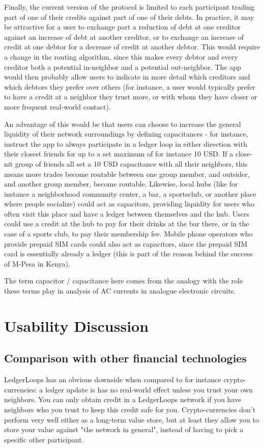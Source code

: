 \documentclass[11pt,twoside,a4paper]{article}
\begin{document}
Finally, the current version of the protocol is limited to each participant trading part of one of their credits against part of one of their debts. In practice, it may be attractive for a user to exchange part a reduction of debt at one creditor against an increase of debt at another creditor, or to exchange an increase of credit at one debtor for a decrease of credit at another debtor. This would require a change in the routing algorithm, since this makes every debtor and every creditor both a potential in-neighbor and a potential out-neighbor. The app would then probably allow users to indicate in more detail which creditors and which debtors they prefer over others (for instance, a user would typically prefer to have a credit at a neighbor they trust more, or with whom they have closer or more frequent real-world contact).

An advantage of this would be that users can choose to increase the general liquidity of their network surroundings by defining capacitances - for instance, instruct the app to always participate in a ledger loop in either direction with their closest friends for up to a set maximum of for instance 10 USD. If a close-nit group of friends all set a 10 USD capacitance with all their neighbors, this means more trades become routable between one group member, and outsider, and another group member, become routable. Likewise, local hubs (like for instance a neighborhood community center, a bar, a sportsclub, or another place where people socialize) could act as capacitors, providing liquidity for users who often visit this place and have a ledger between themselves and the hub. Users could use a credit at the hub to pay for their drinks at the bar there, or in the case of a sports club, to pay their membership fee. Mobile phone operators who provide prepaid SIM cards could also act as capacitors, since the prepaid SIM card is essentially already a ledger (this is part of the reason behind the success of M-Pesa in Kenya).

The term capacitor / capacitance here comes from the analogy with the role these terms play in analysis of AC currents in analogue electronic circuits.

\section{Usability Discussion}
\subsection{Comparison with other financial technologies}
LedgerLoops has an obvious downside when compared to for instance crypto-currencies: a ledger update is has no real-world effect unless you trust your own neighbors. You can only obtain credit in a LedgerLoops network if you have neighbors who you trust to keep this credit safe for you. Crypto-currencies don't perform very well either as a long-term value store, but at least they allow you to store your value against "the network in general", instead of having to pick a specific other participant.
\end{document}
